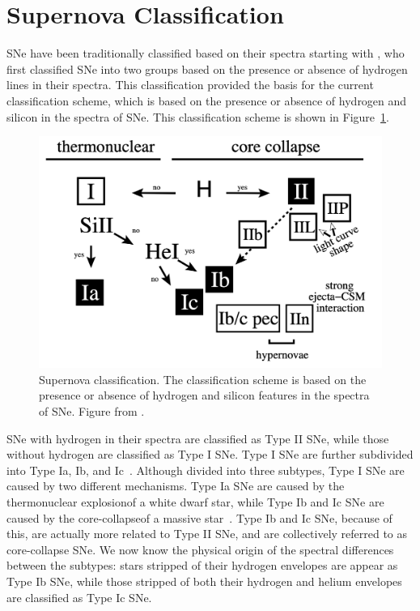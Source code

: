 \section{Supernova Classification}
\label{sec:supernova-classification}
SNe have been traditionally classified based on their spectra starting with 
\textcite{Minkowski1941}, who first classified SNe into two groups based on the
presence or absence of hydrogen lines in their spectra. This classification provided 
the basis for the current classification scheme, which is based on the presence
or absence of hydrogen and silicon in the spectra of SNe. This classification 
scheme is shown in Figure~\ref{fig:sn-classification}. 

\begin{figure}[ht]
    \centering
    \includegraphics[width=0.8\linewidth]{figures/supernova_class.png }
    \caption[Supernova Classification]{Supernova classification. The 
    classification scheme is based on the presence or absence of hydrogen and 
    silicon features in the spectra of SNe. Figure from \textcite{Turatto2003}.}
    \label{fig:sn-classification}
\end{figure}

SNe with hydrogen in their spectra are classified as Type II SNe, while those
without hydrogen are classified as Type I SNe. Type I SNe are further
subdivided into Type Ia, Ib, and Ic~\parencite{Turatto2003}. Although divided into three subtypes, Type I SNe are caused by two different mechanisms. Type Ia SNe are caused by the thermonuclear explosionof a white dwarf star, while Type Ib and Ic SNe are caused by the core-collapseof a massive star~\parencite{Filippenko1997}. Type Ib and Ic SNe, because of this, are actually more related to Type II SNe, and are collectively referred to as core-collapse SNe. We now know the physical origin of the spectral differences between the subtypes: stars stripped of their hydrogen envelopes are appear as Type Ib SNe, while those stripped of both their hydrogen and helium envelopes are classified as Type Ic SNe.

